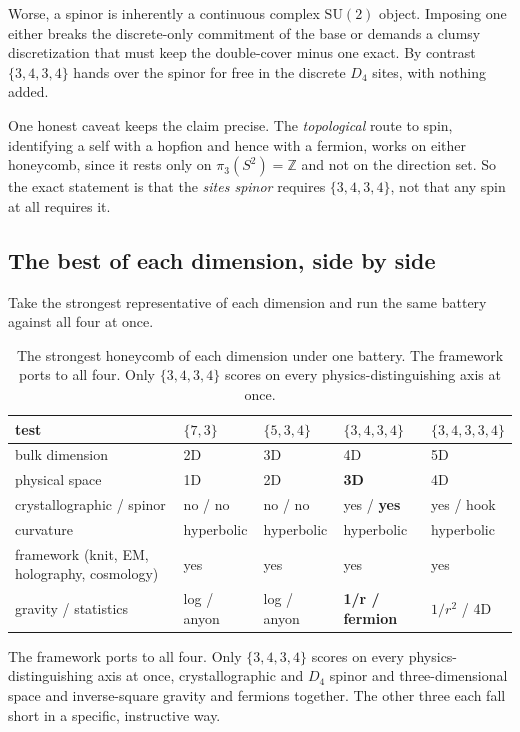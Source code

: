 Worse, a spinor is inherently a continuous complex $\mathrm{SU}(2)$ object. Imposing one either breaks the discrete-only commitment of the base or demands a clumsy discretization that must keep the double-cover minus one exact. By contrast $\{3,4,3,4\}$ hands over the spinor for free in the discrete $D_4$ sites, with nothing added.

One honest caveat keeps the claim precise. The \emph{topological} route to spin, identifying a self with a hopfion and hence with a fermion, works on either honeycomb, since it rests only on $\pi_3(S^2) = \mathbb{Z}$ and not on the direction set. So the exact statement is that the \emph{sites spinor} requires $\{3,4,3,4\}$, not that any spin at all requires it.

\subsection{The best of each dimension, side by side}

Take the strongest representative of each dimension and run the same battery against all four at once.

\begin{table}[ht]
\centering
\begin{tabular}{@{}lllll@{}}
\toprule
test & $\{7,3\}$ & $\{5,3,4\}$ & $\{3,4,3,4\}$ & $\{3,4,3,3,4\}$ \\
\midrule
bulk dimension & 2D & 3D & 4D & 5D \\
physical space & 1D & 2D & \textbf{3D} & 4D \\
crystallographic / spinor & no / no & no / no & yes / \textbf{yes} & yes / hook \\
curvature & hyperbolic & hyperbolic & hyperbolic & hyperbolic \\
framework (knit, EM, holography, cosmology) & yes & yes & yes & yes \\
gravity / statistics & log / anyon & log / anyon & \textbf{1/r / fermion} & $1/r^2$ / 4D \\
\bottomrule
\end{tabular}
\caption{The strongest honeycomb of each dimension under one battery. The framework ports to all four. Only $\{3,4,3,4\}$ scores on every physics-distinguishing axis at once.}
\label{tab:best-of-each}
\end{table}

The framework ports to all four. Only $\{3,4,3,4\}$ scores on every physics-distinguishing axis at once, crystallographic and $D_4$ spinor and three-dimensional space and inverse-square gravity and fermions together. The other three each fall short in a specific, instructive way.

